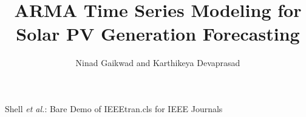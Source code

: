 \documentclass[journal]{IEEEtran}
\begin{document}
%
\title{ARMA Time Series Modeling for Solar PV Generation Forecasting}
%
%
%

\author{Ninad Gaikwad and Karthikeya Devaprasad}

% 
%



%
{Shell \MakeLowercase{\textit{et al.}}: Bare Demo of IEEEtran.cls for IEEE Journals}
% 
\end{document}

